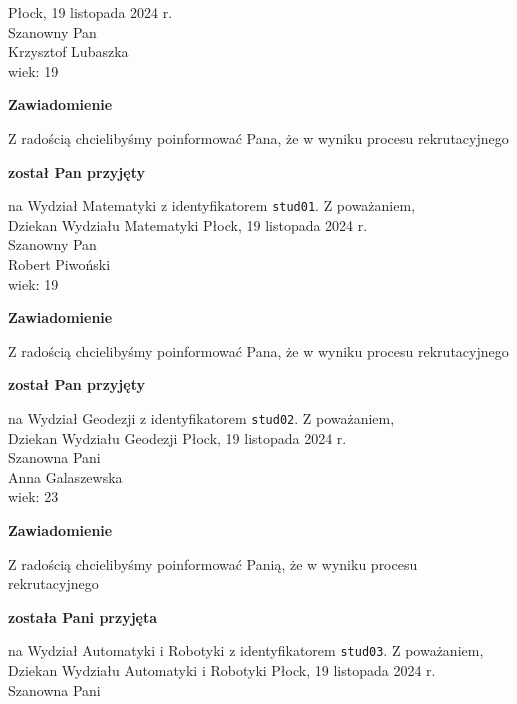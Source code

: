 \documentclass[12pt,a4paper]{article}
\begin{document}
 
\hfill Płock, 19 listopada 2024 r. \\
\noindent
Szanowny Pan \\
Krzysztof Lubaszka \\
wiek: 19
\bigskip
\begin{center}
    {\Large\textbf{Zawiadomienie}}
\end{center}
\bigskip 
Z radością chcielibyśmy poinformować Pana, że w wyniku procesu rekrutacyjnego
\begin{center}
\textsf{\textbf{został Pan przyjęty}}
\end{center}
na Wydział Matematyki z identyfikatorem \verb|stud01|. 
\vspace{2cm}
\noindent
Z poważaniem, \\
Dziekan
Wydziału Matematyki
\newpage
\hfill Płock, 19 listopada 2024 r. \\
\noindent
Szanowny Pan \\
Robert Piwoński  \\
wiek: 19
\bigskip
\begin{center}
    {\Large\textbf{Zawiadomienie}}
\end{center}
\bigskip 
Z radością chcielibyśmy poinformować Pana, że w wyniku procesu rekrutacyjnego
\begin{center}
\textsf{\textbf{został Pan przyjęty}}
\end{center}
na Wydział Geodezji z identyfikatorem \verb|stud02|. 
\vspace{2cm}
\noindent
Z poważaniem, \\
Dziekan
Wydziału Geodezji
\newpage
\hfill Płock, 19 listopada 2024 r. \\
\noindent
Szanowna Pani \\
Anna Galaszewska  \\
wiek: 23
\bigskip
\begin{center}
    {\Large\textbf{Zawiadomienie}}
\end{center}
\bigskip 
Z radością chcielibyśmy poinformować Panią, że w wyniku procesu rekrutacyjnego
\begin{center}
\textsf{\textbf{została Pani przyjęta}}
\end{center}
na Wydział Automatyki i Robotyki z identyfikatorem \verb|stud03|. 
\vspace{2cm}
\noindent
Z poważaniem, \\
Dziekan
Wydziału Automatyki i Robotyki
\newpage
\hfill Płock, 19 listopada 2024 r. \\
\noindent
Szanowna Pani \\
\end{document}
